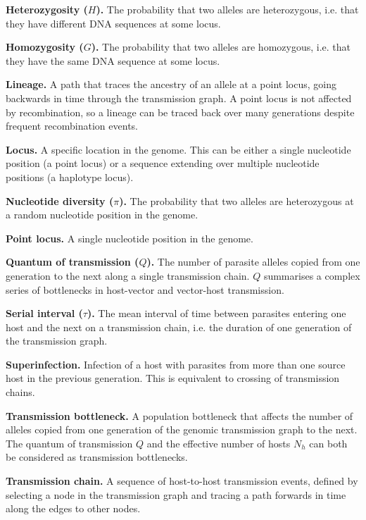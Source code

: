 \documentclass[_main.tex]{subfiles}
\begin{document}
{{\medskip

\textbf{Heterozygosity ($H$).}  The probability that two alleles are heterozygous, i.e. that they have different DNA sequences at some locus. 

\medskip

\textbf{Homozygosity ($G$).}  The probability that two alleles are homozygous, i.e. that they have the same DNA sequence at some locus.

\medskip

\textbf{Lineage.} A path that traces the ancestry of an allele at a point locus, going backwards in time through the transmission graph.  A point locus is not affected by recombination, so a lineage can be traced back over many generations despite frequent recombination events.

\medskip

\textbf{Locus.}  A specific location in the genome.  This can be either a single nucleotide position (a point locus) or a sequence extending over multiple nucleotide positions (a haplotype locus).

\medskip

\textbf{Nucleotide diversity ($\pi$).}  The probability that two alleles are heterozygous at a random nucleotide position in the genome.

\medskip

\textbf{Point locus.}  A single nucleotide position in the genome. 

\medskip

\textbf{Quantum of transmission ($Q$).} The number of parasite alleles copied from one generation to the next along a single transmission chain.  $Q$ summarises a complex series of bottlenecks in host-vector and vector-host transmission.

\medskip

\textbf{Serial interval ($\tau$).}  The mean interval of time between parasites entering one host and the next on a transmission chain, i.e. the duration of one generation of the transmission graph.

\medskip

\textbf{Superinfection.}  Infection of a host with parasites from more than one source host in the previous generation.  This is equivalent to crossing of transmission chains.

\medskip

\textbf{Transmission bottleneck.}  A population bottleneck that affects the number of alleles copied from one generation of the genomic transmission graph to the next.  The quantum of transmission $Q$ and the effective number of hosts $N_h$ can both be considered as transmission bottlenecks.

\medskip

\textbf{Transmission chain.}  A sequence of host-to-host transmission events, defined by selecting a node in the transmission graph and tracing a path forwards in time along the edges to other nodes.


    }%
}
\end{document}
